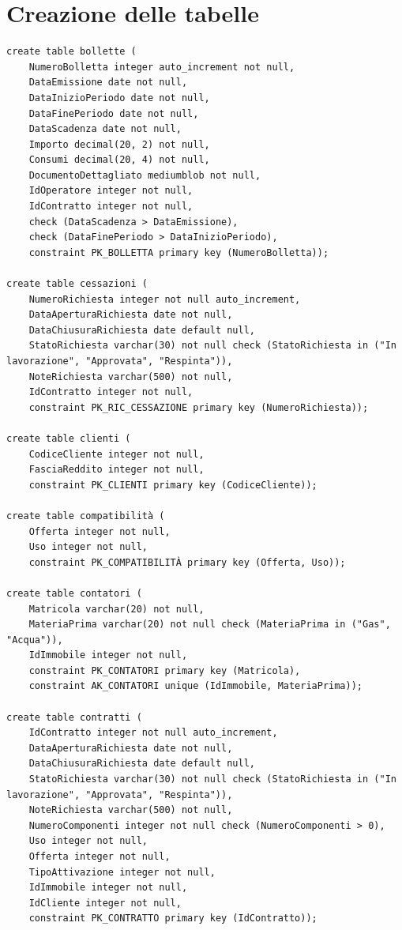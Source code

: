 \documentclass[a4paper,12pt]{report}
\begin{document}
\section{Creazione delle tabelle}
\begin{lstlisting}
create table bollette (
    NumeroBolletta integer auto_increment not null,
    DataEmissione date not null,
    DataInizioPeriodo date not null,
    DataFinePeriodo date not null,
    DataScadenza date not null,
    Importo decimal(20, 2) not null,
    Consumi decimal(20, 4) not null,
    DocumentoDettagliato mediumblob not null,
    IdOperatore integer not null,
    IdContratto integer not null,
    check (DataScadenza > DataEmissione),
    check (DataFinePeriodo > DataInizioPeriodo),
    constraint PK_BOLLETTA primary key (NumeroBolletta));
    
create table cessazioni (
    NumeroRichiesta integer not null auto_increment,
    DataAperturaRichiesta date not null,
    DataChiusuraRichiesta date default null,
    StatoRichiesta varchar(30) not null check (StatoRichiesta in ("In lavorazione", "Approvata", "Respinta")),
    NoteRichiesta varchar(500) not null,
    IdContratto integer not null,
    constraint PK_RIC_CESSAZIONE primary key (NumeroRichiesta));
    
create table clienti (
    CodiceCliente integer not null,
    FasciaReddito integer not null,
    constraint PK_CLIENTI primary key (CodiceCliente));

create table compatibilità (
    Offerta integer not null,
    Uso integer not null,
    constraint PK_COMPATIBILITÀ primary key (Offerta, Uso));
    
create table contatori (
    Matricola varchar(20) not null,
    MateriaPrima varchar(20) not null check (MateriaPrima in ("Gas", "Acqua")),
    IdImmobile integer not null,
    constraint PK_CONTATORI primary key (Matricola),
    constraint AK_CONTATORI unique (IdImmobile, MateriaPrima));

create table contratti (
    IdContratto integer not null auto_increment,
    DataAperturaRichiesta date not null,
    DataChiusuraRichiesta date default null,
    StatoRichiesta varchar(30) not null check (StatoRichiesta in ("In lavorazione", "Approvata", "Respinta")),
    NoteRichiesta varchar(500) not null,
    NumeroComponenti integer not null check (NumeroComponenti > 0),
    Uso integer not null,
    Offerta integer not null,
    TipoAttivazione integer not null,
    IdImmobile integer not null,
    IdCliente integer not null,
    constraint PK_CONTRATTO primary key (IdContratto));


\end{lstlisting}
\end{document}
